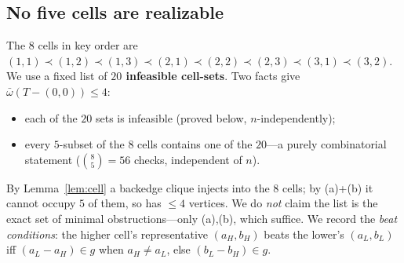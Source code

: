 \documentclass[11pt]{article}
\newcommand{\ob}{\bar\omega}
\theoremstyle{plain}
\theoremstyle{definition}
\begin{document}
\subsection{No five cells are realizable}
The $8$ cells in key order are
$(1,1)\prec(1,2)\prec(1,3)\prec(2,1)\prec(2,2)\prec(2,3)\prec(3,1)\prec(3,2)$. We use a fixed list
of \textbf{$20$ infeasible cell-sets}. Two facts give $\ob(T-(0,0))\le4$:
\begin{itemize}[nosep]
\item[(a)] each of the $20$ sets is infeasible (proved below, $n$-independently);
\item[(b)] every $5$-subset of the $8$ cells contains one of the $20$---a purely combinatorial
statement ($\binom{8}{5}=56$ checks, independent of $n$).
\end{itemize}
By Lemma~\ref{lem:cell} a backedge clique injects into the $8$ cells; by (a)+(b) it cannot occupy
$5$ of them, so has $\le4$ vertices. We do \emph{not} claim the list is the exact set of minimal
obstructions---only (a),(b), which suffice. We record the \emph{beat conditions}: the higher
cell's representative $(a_H,b_H)$ beats the lower's $(a_L,b_L)$ iff $(a_L-a_H)\in g$ when
$a_H\ne a_L$, else $(b_L-b_H)\in g$.
\end{document}
